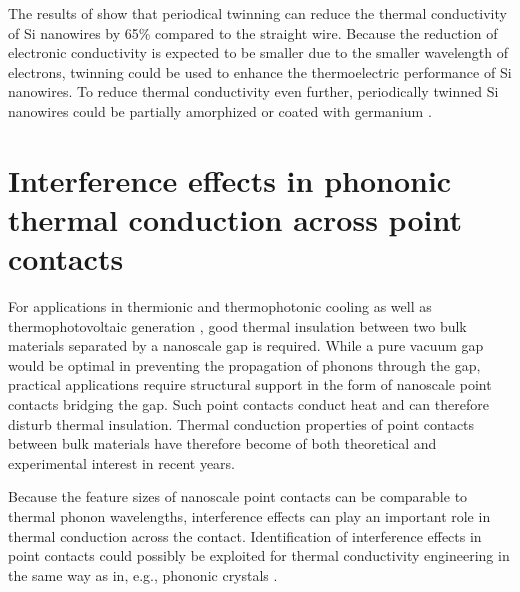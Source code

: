 The results of  show that periodical twinning can reduce the thermal conductivity of Si nanowires by 65\% compared to the straight wire.  Because the reduction of electronic conductivity is expected to be smaller due to the smaller wavelength of electrons, twinning could be used to enhance the thermoelectric performance of Si nanowires. To reduce thermal conductivity even further, periodically twinned Si nanowires could be partially amorphized \cite{donadio09} or coated with germanium \cite{hu11}. 

\section{Interference effects in phononic thermal conduction across point contacts}
\label{sec:results_interference}

For applications in thermionic \cite{zeng06}\cite{westover08} and thermophotonic \cite{oksanen08} cooling as well as thermophotovoltaic generation \cite{dimatteo01}, good thermal insulation between two bulk materials separated by a nanoscale gap is required. While a pure vacuum gap would be optimal in preventing the propagation of phonons through the gap, practical applications require structural support in the form of nanoscale point contacts bridging the gap. Such point contacts conduct heat and can therefore disturb thermal insulation. Thermal conduction properties of point contacts between bulk materials have therefore become of both theoretical \cite{saha07} and experimental \cite{bartsch12} interest in recent years.

Because the feature sizes of nanoscale point contacts can be comparable to thermal phonon wavelengths, interference effects can play an important role in thermal conduction across the contact. Identification of interference effects in point contacts could possibly be exploited for thermal conductivity engineering in the same way as in, e.g., phononic crystals \cite{maldovan13}.

